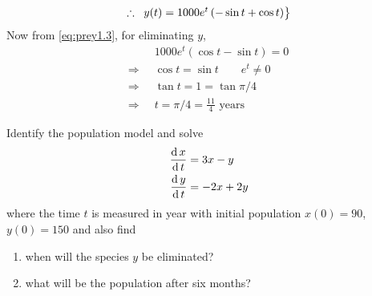 \documentclass[../main-sheet.tex]{subfiles}
\begin{document}
\begin{soln}
\begin{equation}
\begin{rcases}
            \therefore\;\;y(t)=1000e^t\left( -\sin t +\cos t \right)
        \end{rcases}
        \label{eq:prey1.3}
    \end{equation}
    Now from \eqref{eq:prey1.3}, for eliminating \(y\),
    \begin{align*}
        &1000e^t(\cos t-\sin t)=0\\
        \Rightarrow\;\;&\cos t=\sin t\qquad e^t\neq 0\\
        \Rightarrow\;\;&\tan t=1=\tan \pi/4\\
        \Rightarrow\;\;&t=\pi/4=\frac{11}{4} \text{ years}
    \end{align*}
\end{soln}
\begin{prob}
    Identify the population model and solve
    \begin{align*}
        \,\frac{\mathrm{d}\,x}{\mathrm{d}\,t}&=3x-y\\
        \,\frac{\mathrm{d}\,y}{\mathrm{d}\,t}&=-2x+2y
    \end{align*}
    where the time \(t\) is measured in year with initial population \(x(0)=90\), \(y(0)=150\) and also find
    \begin{enumerate}[label=(\roman*)]
        \item when will the species \(y\) be eliminated?
        \item what will be the population after six months?
    \end{enumerate}
\end{prob}
\end{document}
